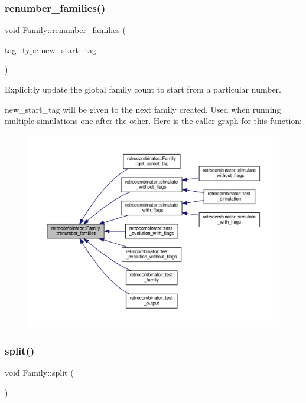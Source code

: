 \subsubsection{\texorpdfstring{renumber\+\_\+families()}{renumber\_families()}}
{\footnotesize\ttfamily void Family\+::renumber\+\_\+families (\begin{DoxyParamCaption}\item[{\hyperlink{namespaceretrocombinator_afd7c6eb4293e8c4d12827609a9a34b9b}{tag\+\_\+type}}]{new\+\_\+start\+\_\+tag }\end{DoxyParamCaption})\hspace{0.3cm}{\ttfamily [static]}}



Explicitly update the global family count to start from a particular number. 

new\+\_\+start\+\_\+tag will be given to the next family created. Used when running multiple simulations one after the other. Here is the caller graph for this function\+:
\nopagebreak
\begin{figure}[H]
\begin{center}
\leavevmode
\includegraphics[width=350pt]{classretrocombinator_1_1Family_a79b180c88225ee52d21da020375d2dfd_icgraph}
\end{center}
\end{figure}
\mbox{\label{classretrocombinator_1_1Family_a721e453eb40fa49bd38ae24df001f9a3}} 
\subsubsection{\texorpdfstring{split()}{split()}}
{\footnotesize\ttfamily void Family\+::split (\begin{DoxyParamCaption}{ }\end{DoxyParamCaption})}



